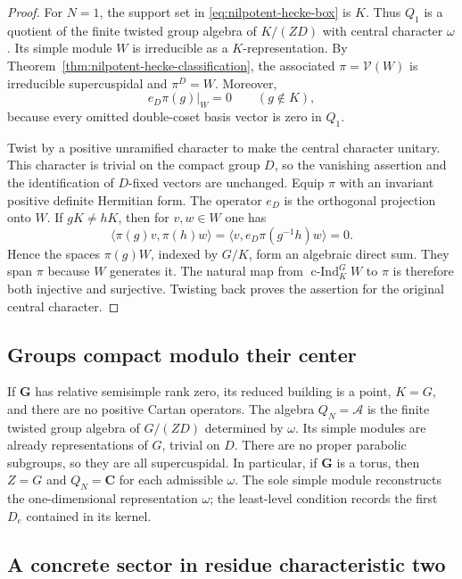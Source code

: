 \documentclass[10pt,letterpaper]{amsart}
\numberwithin{equation}{section}
\theoremstyle{remark}
\newcommand{\C}{\mathbf C}
\begin{document}
\begin{proof}
For $N=1$, the support set in \eqref{eq:nilpotent-hecke-box} is $K$.
Thus $Q_1$ is a quotient of the finite twisted group algebra of $K/(ZD)$
with central character $\omega$. Its simple module $W$ is irreducible
as a $K$-representation. By
Theorem~\ref{thm:nilpotent-hecke-classification}, the associated
$\pi=\mathcal V(W)$ is irreducible supercuspidal and $\pi^D=W$.
Moreover,
\[
 e_D\pi(g)|_W=0\qquad(g\notin K),
\]
because every omitted double-coset basis vector is zero in $Q_1$.

Twist by a positive unramified character to make the central character
unitary. This character is trivial on the compact group $D$, so the
vanishing assertion and the identification of $D$-fixed vectors are
unchanged. Equip $\pi$ with an invariant positive definite Hermitian
form. The operator $e_D$ is the orthogonal projection onto $W$.
If $gK\ne hK$, then for $v,w\in W$ one has
\[
 \langle\pi(g)v,\pi(h)w\rangle
 =\langle v,e_D\pi(g^{-1}h)w\rangle=0.
\]
Hence the spaces $\pi(g)W$, indexed by $G/K$, form an algebraic direct
sum. They span $\pi$ because $W$ generates it. The natural map from
$\operatorname{c-Ind}_K^G W$ to $\pi$ is therefore both injective and
surjective. Twisting back proves the assertion for the original central
character.
\end{proof}



\subsection{Groups compact modulo their center}

If $\mathbf G$ has relative semisimple rank zero, its reduced building is
a point, $K=G$, and there are no positive Cartan operators. The algebra
$Q_N=\mathcal A$ is the finite twisted group algebra of $G/(ZD)$ determined
by $\omega$. Its simple modules are already representations of $G$,
trivial on $D$. There are no proper parabolic subgroups, so they are all
supercuspidal. In particular, if $\mathbf G$ is a torus, then $Z=G$ and
$Q_N=\C$ for each admissible $\omega$. The sole simple module reconstructs
the one-dimensional representation $\omega$; the least-level condition
records the first $D_e$ contained in its kernel.

\subsection{A concrete sector in residue characteristic two}
\end{document}
